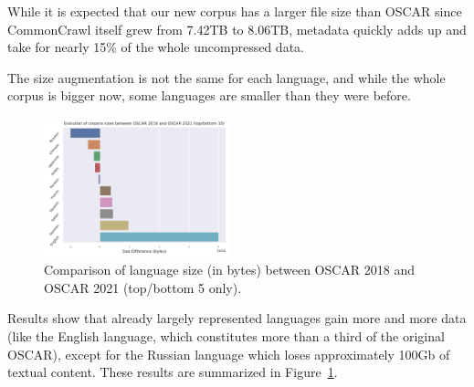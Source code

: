 While it is expected that our new corpus has a larger file size than OSCAR since CommonCrawl itself grew from 7.42TB to 8.06TB, metadata quickly adds up and take for nearly 15\% of the whole uncompressed data.

\begin{table}[t]
    \centering\small
    \caption{Comparison of CommonCrawl and OSCAR sizes between 2018 and 2021 versions. Compressed (CommonCrawl) sources are from November 2018 and February 2021. Total is Textual + Metadata without deduplication.}
    \label{tab:oscar-size}
\end{table}

The size augmentation is not the same for each language, and while the whole corpus is bigger now, some languages are smaller than they were before.

\begin{figure}[ht]
    \includegraphics[width=0.48\textwidth, angle=0]{static/media/data/ungoliant/size_evo}
    \caption{Comparison of language size (in bytes) between OSCAR 2018 and OSCAR 2021 (top/bottom 5 only). }
    \label{fig:lang-size}
\end{figure}

Results show that already largely represented languages gain more and more data (like the English language, which constitutes more than a third of the original OSCAR), except for the Russian language which loses approximately 100Gb of textual content. These results are summarized in Figure~\ref{fig:lang-size}.

